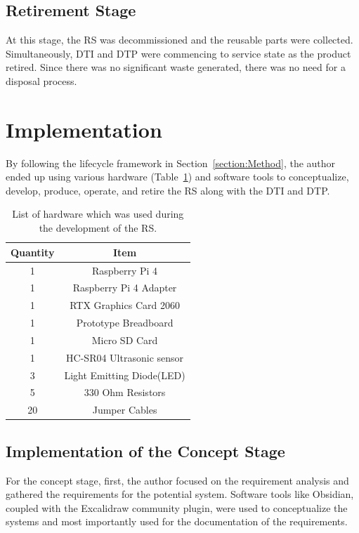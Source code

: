 \documentclass[conference]{IEEEtran}
\begin{document}
    \subsection{Retirement Stage}

    At this stage, the RS was decommissioned and the reusable parts were collected. Simultaneously, DTI and DTP were commencing to service state as the product retired. 
    Since there was no significant waste generated, there was no need for a disposal process.   

   
    \section{Implementation}\label{section:implementation}

    By following the lifecycle framework in Section~\ref{section:Method}, the author ended up using various hardware (Table~\ref{tab:Hardware}) and software tools to conceptualize, 
    develop, produce, operate, and retire the RS along with the DTI and DTP.
    
    \begin{table}[htbp]
        \caption{List of hardware which was used during the development of the RS.}\label{tab:Hardware}
        \begin{tabular}{c c}
        \textbf{Quantity} & \textbf{Item} \\
        \hline
        1 & Raspberry Pi 4 \\
        1 & Raspberry Pi 4 Adapter \\
        1 & RTX Graphics Card 2060 \\
        1 & Prototype Breadboard \\
        1 & Micro SD Card \\
        1 & HC-SR04 Ultrasonic sensor \\
        3 & Light Emitting Diode(LED) \\
        5 & 330 Ohm Resistors \\
        20 & Jumper Cables \\
        \end{tabular}
        \end{table}
    
        
    \subsection{Implementation of the Concept Stage}
    For the concept stage, first, the author focused on the requirement analysis and gathered the requirements for the potential system. Software tools like Obsidian, coupled with the Excalidraw community plugin, 
    were used to conceptualize the systems and most importantly used for the documentation of the requirements.   
\end{document}
